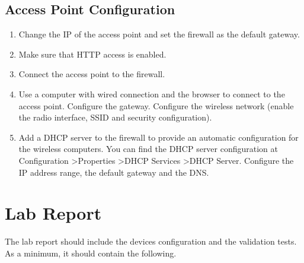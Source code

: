 \subsection{Access Point Configuration}

\begin{enumerate}
\item Change the IP of the access point and set the firewall as the default gateway.
\item Make sure that HTTP access is enabled.
\item Connect the access point to the firewall.
\item Use a computer with wired connection and the browser to connect to the access point. Configure the gateway. Configure the wireless network (enable the radio interface, SSID and security configuration).
\item Add a DHCP server to the firewall to provide an automatic configuration for the wireless computers. You can find the DHCP server configuration at \textsf{Configuration} \textgreater \textsf{Properties} \textgreater \textsf{DHCP Services} \textgreater \textsf{DHCP Server}. Configure the IP address range, the default gateway and the DNS.
\end{enumerate}

\section{Lab Report}

The lab report should include the devices configuration and the validation tests. As a minimum, it should contain the following.

